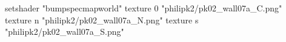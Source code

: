 setshader "bumpspecmapworld"
    texture 0 "philipk2/pk02_wall07a_C.png"
    texture n "philipk2/pk02_wall07a_N.png"
    texture s "philipk2/pk02_wall07a_S.png"